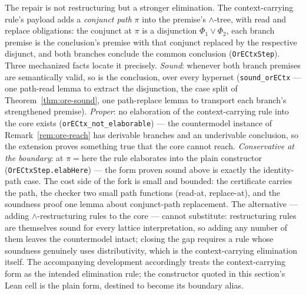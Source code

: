 \begin{bremark}
\label{rem:ore-fork}
The repair is not restructuring but a stronger elimination. The
context-carrying rule's payload adds a \emph{conjunct path} $\pi$ into
the premise's $\wedge$-tree, with read and replace obligations: the
conjunct at $\pi$ is a disjunction $\Phi_1 \vee \Phi_2$, each branch
premise is the conclusion's premise with that conjunct replaced by the
respective disjunct, and both branches conclude the common conclusion
(\texttt{OrECtxStep}). Three mechanized facts locate it precisely.
\emph{Sound}: whenever both branch premises are semantically valid, so
is the conclusion, over every hypernet (\texttt{sound\_orECtx} --- one
path-read lemma to extract the disjunction, the case split of
Theorem~\ref{thm:ore-sound}, one path-replace lemma to transport each
branch's strengthened premise). \emph{Proper}: no elaboration of the
context-carrying rule into the core exists
(\texttt{orECtx\_not\_elaborable}) --- the countermodel instance of
Remark~\ref{rem:ore-reach} has derivable branches and an underivable
conclusion, so the extension proves something true that the core cannot
reach. \emph{Conservative at the boundary}: at $\pi = \mathrm{here}$
the rule elaborates into the plain constructor
(\texttt{OrECtxStep.elabHere}) --- the form proven sound above is
exactly the identity-path case. The cost side of the fork is small and
bounded: the certificate carries the path, the checker two small path
functions (read-at, replace-at), and the soundness proof one lemma
about conjunct-path replacement. The alternative --- adding
$\wedge$-restructuring rules to the core --- cannot substitute:
restructuring rules are themselves sound for every lattice
interpretation, so adding any number of them leaves the countermodel
intact; closing the gap requires a rule whose soundness genuinely uses
distributivity, which is the context-carrying elimination itself. The
accompanying development accordingly treats the context-carrying form
as the intended elimination rule; the constructor quoted in this
section's Lean cell is the plain form, destined to become its boundary
alias.
\end{bremark}

